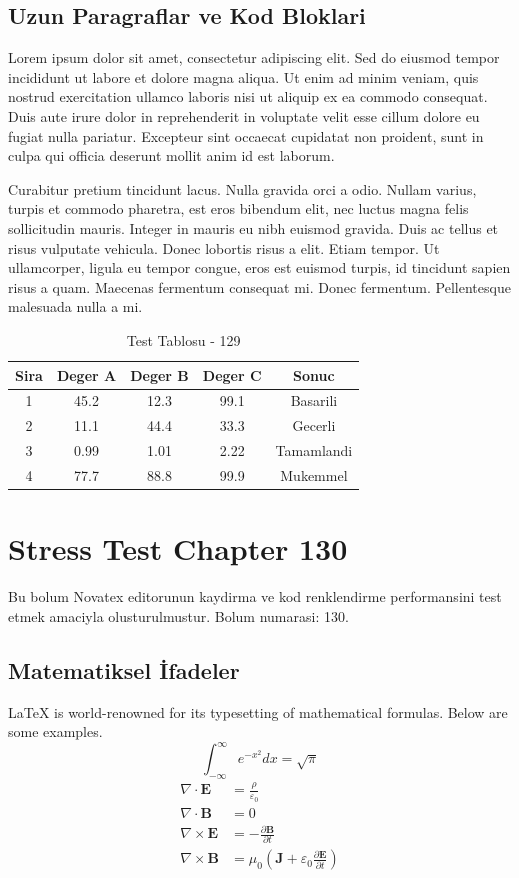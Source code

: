 \documentclass[12pt,a4paper]{article}
\begin{document}
\subsection{Uzun Paragraflar ve Kod Bloklari}
Lorem ipsum dolor sit amet, consectetur adipiscing elit. Sed do eiusmod tempor incididunt ut labore et dolore magna aliqua. Ut enim ad minim veniam, quis nostrud exercitation ullamco laboris nisi ut aliquip ex ea commodo consequat. Duis aute irure dolor in reprehenderit in voluptate velit esse cillum dolore eu fugiat nulla pariatur. Excepteur sint occaecat cupidatat non proident, sunt in culpa qui officia deserunt mollit anim id est laborum.

Curabitur pretium tincidunt lacus. Nulla gravida orci a odio. Nullam varius, turpis et commodo pharetra, est eros bibendum elit, nec luctus magna felis sollicitudin mauris. Integer in mauris eu nibh euismod gravida. Duis ac tellus et risus vulputate vehicula. Donec lobortis risus a elit. Etiam tempor. Ut ullamcorper, ligula eu tempor congue, eros est euismod turpis, id tincidunt sapien risus a quam. Maecenas fermentum consequat mi. Donec fermentum. Pellentesque malesuada nulla a mi.

\begin{table}[h!]
\centering
\begin{tabular}{|c|c|c|c|c|}
\hline
\textbf{Sira} & \textbf{Deger A} & \textbf{Deger B} & \textbf{Deger C} & \textbf{Sonuc} \\
\hline
1 & 45.2 & 12.3 & 99.1 & Basarili \\
2 & 11.1 & 44.4 & 33.3 & Gecerli \\
3 & 0.99 & 1.01 & 2.22 & Tamamlandi \\
4 & 77.7 & 88.8 & 99.9 & Mukemmel \\
\hline
\end{tabular}
\caption{Test Tablosu - 129}
\end{table}

\newpage
\section{Stress Test Chapter 130}
Bu bolum Novatex editorunun kaydirma ve kod renklendirme performansini test etmek amaciyla olusturulmustur. Bolum numarasi: 130.

\subsection{Matematiksel İfadeler}
\LaTeX{} is world-renowned for its typesetting of mathematical formulas. Below are some examples.
\begin{equation}
\int_{-\infty}^{\infty} e^{-x^2} dx = \sqrt{\pi}
\end{equation}
\begin{align}
\nabla \cdot \mathbf{E} &= \frac{\rho}{\varepsilon_0} \\
\nabla \cdot \mathbf{B} &= 0 \\
\nabla \times \mathbf{E} &= -\frac{\partial \mathbf{B}}{\partial t} \\
\nabla \times \mathbf{B} &= \mu_0\left(\mathbf{J} + \varepsilon_0 \frac{\partial \mathbf{E}}{\partial t}\right)
\end{align}
\end{document}

